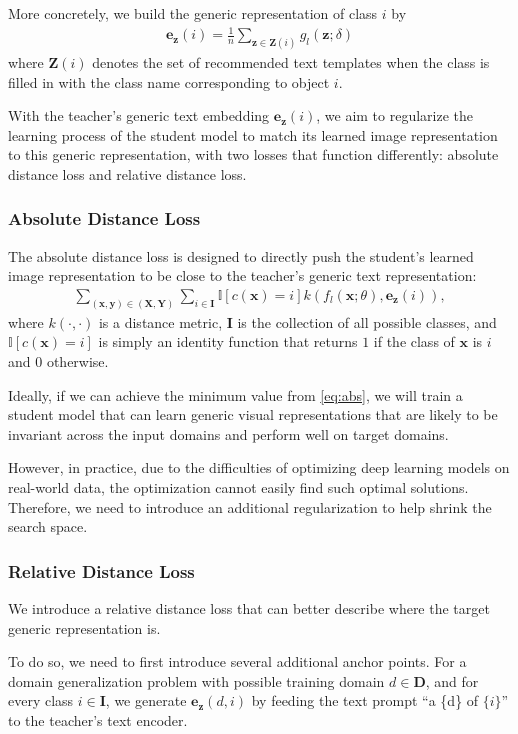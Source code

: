\documentclass[10pt,twocolumn,letterpaper]{article}
\newcommand{\X}{\mathbf{X}}
\newcommand{\Y}{\mathbf{Y}}
\newcommand{\x}{\mathbf{x}}
\newcommand{\y}{\mathbf{y}}
\newcommand{\z}{\mathbf{z}}
\begin{document}
More concretely, we build the generic representation of class $i$ by 
\begin{align*}
    \mathbf{e_\z}(i) = \frac{1}{n}\sum_{\z \in \mathbf{Z}(i)}g_l(\z;\delta)
\end{align*}
where $\mathbf{Z}(i)$ denotes the set of recommended 
text templates when the class is filled in with the class
name corresponding to object $i$. 

With the teacher's generic text embedding $\mathbf{e_\z}(i)$, we aim to regularize the learning process of the student model to match its learned image representation to this generic representation, with two losses that function differently: absolute distance loss and relative distance loss. 

\subsubsection{Absolute Distance Loss}

The absolute distance loss is designed to directly push the student's learned image representation to be close to the teacher's generic text representation:
\begin{align}
    \sum_{(\x,\y)\in(\X,\Y)}\sum_{i\in\mathbf{I}} \mathbb{I}[c(\x)=i]k(f_l(\x;\theta), \mathbf{e_\z}(i)), 
    \label{eq:abs}
\end{align}
where $k(\cdot,\cdot)$ is a distance metric, $\mathbf{I}$ is the collection of all possible classes, and $\mathbb{I}[c(\x)=i]$ is simply an identity function that returns $1$ if the class of $\x$ is $i$ and $0$ otherwise. 

Ideally, if we can achieve the minimum value from \eqref{eq:abs}, we will train a student model that can learn generic 
visual representations that are likely to be invariant across the input 
domains and perform well on target domains. 

However, in practice, due to the difficulties of optimizing deep learning models on real-world data, the optimization cannot easily find such optimal solutions. Therefore, we need to introduce an 
additional regularization to help shrink the search space. 

\subsubsection{Relative Distance Loss}
We introduce a relative distance loss that can better describe where the target generic representation is. 

To do so, we need to first introduce several additional anchor points. For a domain generalization problem with possible training domain $d\in\mathbf{D}$, 
and for every class $i\in\mathbf{I}$, 
we generate $\mathbf{e}_\z(d, i)$ 
by feeding the text prompt 
``a \{d\} of $\{i\}$'' to the teacher's text encoder. 
\end{document}
